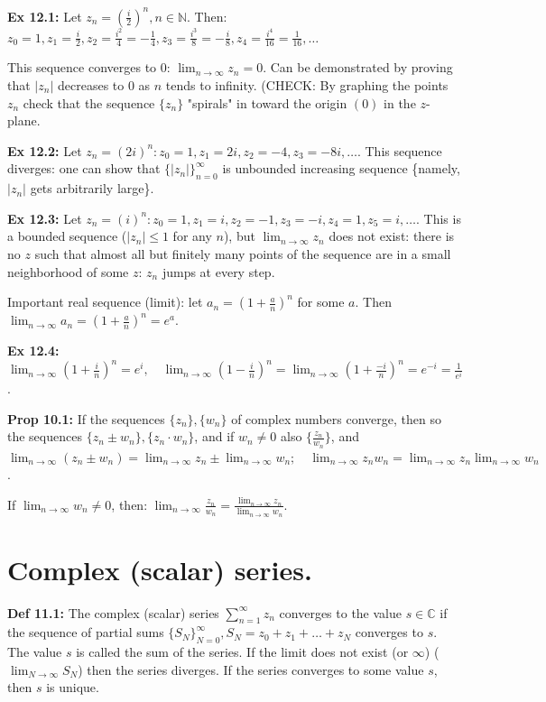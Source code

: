 \documentclass{article}
\begin{document}
\textbf{Ex 12.1:} Let $z_n = (\frac{i}{2})^n, n \in \mathbb{N}$. Then: $z_0 = 1, z_1 = \frac{i}{2}, z_2 = \frac{i^2}{4} = -\frac{1}{4}, z_3 = \frac{i^3}{8} = -\frac{i}{8}, z_4 = \frac{i^4}{16} = \frac{1}{16}, \dots$

This sequence converges to 0: $\lim_{n \to \infty} z_n = 0$. Can be demonstrated by proving that $|z_n|$ decreases to 0 as $n$ tends to infinity. (CHECK: By graphing the points $z_n$ check that the sequence
$\{z_n\}$ "spirals" in toward the origin $(0)$ in the $z$-plane.

\textbf{Ex 12.2:} Let $z_n = (2i)^n: z_0 = 1, z_1 = 2i, z_2 = -4, z_3 = -8i, \dots$. This sequence diverges: one can show that $\{|z_n|\}_{n=0}^{\infty}$ is unbounded increasing sequence \{namely, $|z_n|$ gets arbitrarily large\}.

\textbf{Ex 12.3:} Let $z_n = (i)^n: z_0 = 1, z_1 = i, z_2 = -1, z_3 = -i, z_4 = 1, z_5 = i, \dots$. This is a bounded sequence ($|z_n| \leq 1$ for any $n$), but $\lim_{n \to \infty} z_n$ does not exist: there is no $z$ such that almost all but finitely many points of the sequence are in a small neighborhood of some $z$: $z_n$ jumps at every step.

Important real sequence (limit): let $a_n = (1 + \frac{a}{n})^n$ for some $a$. Then $\lim_{n \to \infty} a_n = (1 + \frac{a}{n})^n = e^a$.

\textbf{Ex 12.4:} $\lim_{n \to \infty} (1 + \frac{i}{n})^n = e^i, \quad \lim_{n \to \infty} (1 - \frac{i}{n})^n = \lim_{n \to \infty} (1 + \frac{-i}{n})^n = e^{-i} = \frac{1}{e^i}$.

\textbf{Prop 10.1:} If the sequences $\{z_n\}, \{w_n\}$ of complex numbers converge, then so the sequences $\{z_n \pm w_n\}, \{z_n \cdot w_n\}$, and if $w_n \neq 0$ also $\{\frac{z_n}{w_n}\}$, and $\lim_{n \to \infty} (z_n \pm w_n) = \lim_{n \to \infty} z_n \pm \lim_{n \to \infty} w_n; \quad \lim_{n \to \infty} z_n w_n = \lim_{n \to \infty} z_n \lim_{n \to \infty} w_n$.

If $\lim_{n \to \infty} w_n \neq 0$, then: $\lim_{n \to \infty} \frac{z_n}{w_n} = \frac{\lim_{n \to \infty} z_n}{\lim_{n \to \infty} w_n}$.

\section{Complex (scalar) series.}

\textbf{Def 11.1:} The complex (scalar) series $\sum_{n=1}^{\infty} z_n$ converges to the value $s \in \mathbb{C}$ if the sequence of partial sums $\{S_N\}_{N=0}^{\infty}, S_N = z_0 + z_1 + \dots + z_N$ converges to $s$. The value $s$ is called the sum of the series. If the limit does not exist (or $\infty$) ($\lim_{N \to \infty} S_N$) then the series diverges. If the series converges to some value $s$, then $s$ is unique.
\end{document}
